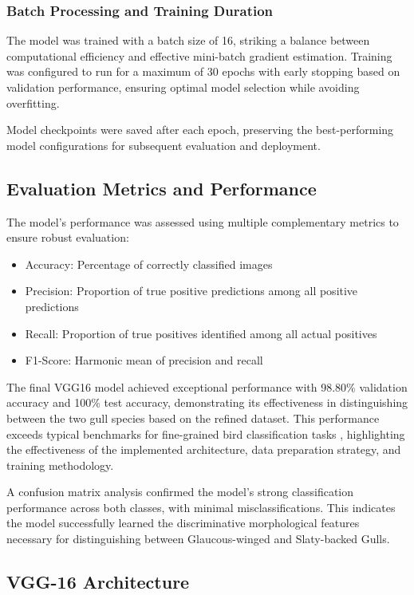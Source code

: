 \documentclass[a4paper,12pt]{article}
\begin{document}
\subsubsection{Batch Processing and Training Duration}

The model was trained with a batch size of 16, striking a balance between computational efficiency and effective mini-batch gradient estimation. Training was configured to run for a maximum of 30 epochs with early stopping based on validation performance, ensuring optimal model selection while avoiding overfitting.

Model checkpoints were saved after each epoch, preserving the best-performing model configurations for subsequent evaluation and deployment.

\subsection{Evaluation Metrics and Performance}

The model's performance was assessed using multiple complementary metrics to ensure robust evaluation:
\begin{itemize}
    \item Accuracy: Percentage of correctly classified images
    \item Precision: Proportion of true positive predictions among all positive predictions
    \item Recall: Proportion of true positives identified among all actual positives
    \item F1-Score: Harmonic mean of precision and recall
\end{itemize}

The final VGG16 model achieved exceptional performance with 98.80\% validation accuracy and 100\% test accuracy, demonstrating its effectiveness in distinguishing between the two gull species based on the refined dataset. This performance exceeds typical benchmarks for fine-grained bird classification tasks \citep{sanchez2019fine}, highlighting the effectiveness of the implemented architecture, data preparation strategy, and training methodology.

A confusion matrix analysis confirmed the model's strong classification performance across both classes, with minimal misclassifications. This indicates the model successfully learned the discriminative morphological features necessary for distinguishing between Glaucous-winged and Slaty-backed Gulls.

\subsection{VGG-16 Architecture}
\end{document}

